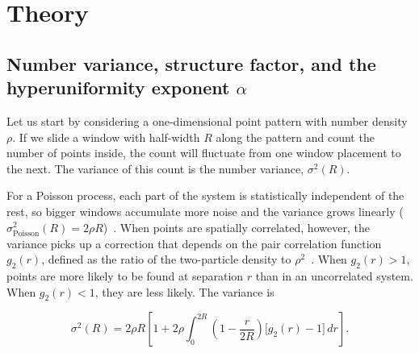 \documentclass[11pt]{article}
\begin{document}
\section{Theory}
\label{sec:theory}

\subsection{Number variance, structure factor, and the hyperuniformity exponent $\alpha$}
\label{sec:theory-variance}
\label{sec:theory-alpha}

Let us start by considering a one-dimensional point pattern with number density $\rho$. If we slide a window with half-width $R$ along the pattern and count the number of points inside, the count will fluctuate from one window placement to the next. The variance of this count is the number variance, $\sigma^2(R)$.

For a Poisson process, each part of the system is statistically independent of the rest, so bigger windows accumulate more noise and the variance grows linearly ($\sigma^2_\text{Poisson}(R) = 2\rho R$)~\cite{torquato2003local}. When points are spatially correlated, however, the variance picks up a correction that depends on the pair correlation function $g_2(r)$, defined as the ratio of the two-particle density to $\rho^2$~\cite{torquato2003local}. When $g_2(r) > 1$, points are more likely to be found at separation $r$ than in an uncorrelated system. When $g_2(r) < 1$, they are less likely. The variance is~\cite{torquato2003local}

\begin{equation}
 \sigma^2(R) = 2\rho R \left[ 1 + 2\rho \int_0^{2R}
 \!\left(1 - \frac{r}{2R}\right)\bigl[g_2(r) - 1\bigr]\,dr \right].
 \label{eq:variance-g2}
\end{equation}
\end{document}
